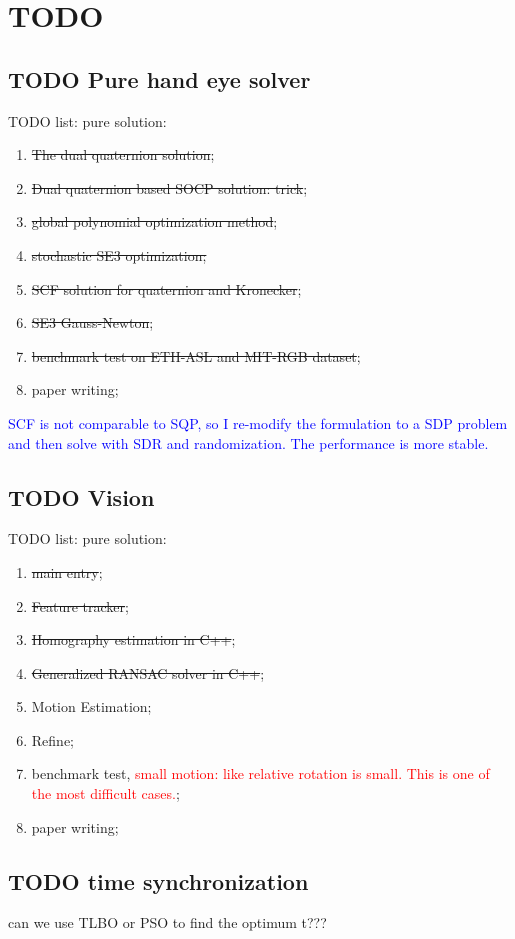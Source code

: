 \documentclass[a4paper]{report}
\begin{document}
\chapter{TODO}
\section{TODO Pure hand eye solver}
TODO list:
pure solution:
\begin{enumerate}
	\item \sout{The dual quaternion solution};
	\item \sout{Dual quaternion based SOCP solution: trick};
	\item \sout{global polynomial optimization method};
	\item \sout{stochastic SE3 optimization;}
	\item \sout{SCF solution for quaternion and Kronecker};
	\item \sout{SE3 Gauss-Newton};
	\item \sout{benchmark test on ETH-ASL and MIT-RGB dataset};
	\item paper writing;
\end{enumerate}
\textcolor{blue}{SCF is not comparable to SQP, so I re-modify the formulation to a SDP problem and then solve with SDR and randomization. The performance is more stable.}


\section{TODO Vision}
TODO list:
pure solution:
\begin{enumerate}
	\item \sout{main entry};
	\item \sout{Feature tracker};
	\item \sout{Homography estimation in C++};
	\item \sout{Generalized RANSAC solver in C++};
	\item Motion Estimation;
	\item Refine;
	\item benchmark test, \textcolor{red}{small motion: like relative rotation is small. This is one of the most difficult cases.};
	\item paper writing;
\end{enumerate}

\section{TODO time synchronization}
can we use TLBO or PSO to find the optimum t???
\end{document}
